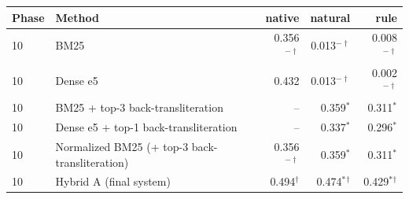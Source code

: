 \begin{tabular}{llrrr}
\toprule
Phase & Method & native & natural & rule \\
\midrule
10 & BM25 & 0.356$^{-\dagger}$ & 0.013$^{-\dagger}$ & 0.008$^{-\dagger}$ \\
10 & Dense e5 & 0.432 & 0.013$^{-\dagger}$ & 0.002$^{-\dagger}$ \\
10 & BM25 + top-3 back-transliteration & -- & 0.359$^{*}$ & 0.311$^{*}$ \\
10 & Dense e5 + top-1 back-transliteration & -- & 0.337$^{*}$ & 0.296$^{*}$ \\
10 & Normalized BM25 (+ top-3 back-transliteration) & 0.356$^{-\dagger}$ & 0.359$^{*}$ & 0.311$^{*}$ \\
10 & Hybrid A (final system) & 0.494$^{\dagger}$ & 0.474$^{*}$$^{\dagger}$ & 0.429$^{*}$$^{\dagger}$ \\
\bottomrule
\end{tabular}

